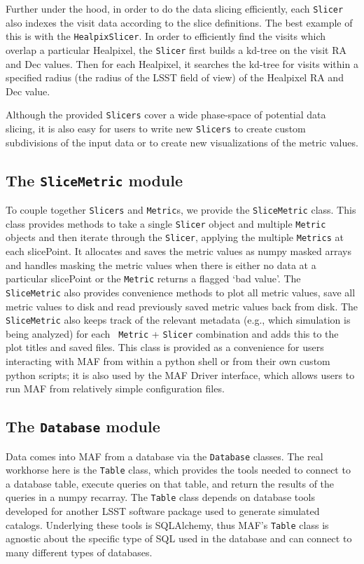 \documentclass[]{spie}  %
\begin{document}
Further under the hood, in order to do the data slicing efficiently,
each {\tt Slicer} also indexes the visit data according to the slice
definitions. The best example of this is with the {\tt HealpixSlicer}. In
order to efficiently find the visits which overlap a particular
Healpixel, the {\tt Slicer} first builds a kd-tree on the visit RA and Dec
values. Then for each Healpixel, it searches the kd-tree for visits
within a specified radius (the radius of the LSST field of view) of
the Healpixel RA and Dec value. 

Although the provided
{\tt Slicers} cover a wide phase-space of potential data slicing, it is
also easy for users to write new {\tt Slicers} to create custom subdivisions
of the input data or to create new visualizations of the metric
values. 

\subsection{The {\tt SliceMetric} module}

To couple together {\tt Slicers} and {\tt Metric}s, we provide
the {\tt SliceMetric} class. This class provides methods to take a single
{\tt Slicer} object and multiple {\tt Metric} objects and then iterate through the
{\tt Slicer}, applying the multiple {\tt Metrics} at each slicePoint. It allocates
and saves the metric values as numpy masked arrays and handles masking
the metric values when there is either no data at a particular
slicePoint or the {\tt Metric} returns a flagged `bad value'. The
{\tt SliceMetric} also provides convenience methods to plot all metric values,
save all metric values to disk and read previously saved metric values
back from disk. The {\tt SliceMetric} also keeps track of the relevant
metadata (e.g., which simulation is being analyzed) for each {\tt
  Metric} + {\tt Slicer} combination and adds this to the
plot titles and saved files. This class is provided as a convenience
for users interacting with MAF from within a python shell or from
their own custom python scripts; it is also used by the MAF Driver
interface, which allows users to run MAF from relatively simple
configuration files.

\subsection{The {\tt Database} module}

Data comes into MAF from a database via the {\tt Database} classes. The real
workhorse here is the {\tt Table} class, which provides the tools needed
to connect to a database table, execute queries on that table, and
return the results of the queries in a numpy recarray. The {\tt Table}
class depends on database tools developed for another LSST software
package used to generate simulated catalogs. Underlying
these tools is SQLAlchemy\cite{sqlalchemy}, thus MAF's {\tt Table}
class is agnostic about the specific type of SQL used in the database
and can connect to many different types of databases.
\end{document}
